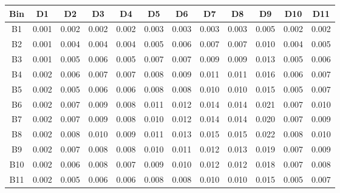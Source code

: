 \begin{tabular}{c@{~~~}c@{~~}c@{~~}c@{~~}c@{~~}c@{~~}c@{~~}c@{~~}c@{~~}c@{~~}c@{~~}c}
\hline 
 \hline 
Bin	& D1 & D2 & D3 & D4 & D5 & D6 & D7 & D8 & D9 & D10 & D11 \\ 
\hline 
B1	&  0.001 &  0.002 &  0.002 &  0.002 &  0.003 &  0.003 &  0.003 &  0.003 &  0.005 &  0.002 &  0.002 \\  
B2	&  0.001 &  0.004 &  0.004 &  0.004 &  0.005 &  0.006 &  0.007 &  0.007 &  0.010 &  0.004 &  0.005 \\  
B3	&  0.001 &  0.005 &  0.006 &  0.005 &  0.007 &  0.007 &  0.009 &  0.009 &  0.013 &  0.005 &  0.006 \\  
B4	&  0.002 &  0.006 &  0.007 &  0.007 &  0.008 &  0.009 &  0.011 &  0.011 &  0.016 &  0.006 &  0.007 \\  
B5	&  0.002 &  0.005 &  0.006 &  0.006 &  0.008 &  0.008 &  0.010 &  0.010 &  0.015 &  0.005 &  0.007 \\  
B6	&  0.002 &  0.007 &  0.009 &  0.008 &  0.011 &  0.012 &  0.014 &  0.014 &  0.021 &  0.007 &  0.010 \\  
B7	&  0.002 &  0.007 &  0.009 &  0.008 &  0.010 &  0.012 &  0.014 &  0.014 &  0.020 &  0.007 &  0.009 \\  
B8	&  0.002 &  0.008 &  0.010 &  0.009 &  0.011 &  0.013 &  0.015 &  0.015 &  0.022 &  0.008 &  0.010 \\  
B9	&  0.002 &  0.007 &  0.008 &  0.008 &  0.010 &  0.011 &  0.012 &  0.013 &  0.019 &  0.007 &  0.009 \\  
B10	&  0.002 &  0.006 &  0.008 &  0.007 &  0.009 &  0.010 &  0.012 &  0.012 &  0.018 &  0.007 &  0.008 \\  
B11	&  0.002 &  0.005 &  0.006 &  0.006 &  0.008 &  0.008 &  0.010 &  0.010 &  0.015 &  0.005 &  0.007 \\  
\hline 
 \hline 
\end{tabular}